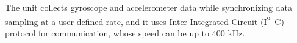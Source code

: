 The unit collects gyroscope and accelerometer data while synchronizing data sampling at a user defined rate, and it uses Inter Integrated Circuit (\si{I^2C}) protocol for communication, whose speed can be up to 400 kHz. 


%
%






